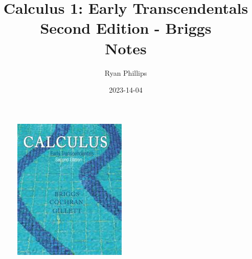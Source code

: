 \documentclass[UTF8]{article}
\begin{document}
\title{%
  Calculus 1: Early Transcendentals\\
  \large Second Edition - Briggs\\
    Notes}

		\date{2023-14-04}
\author{Ryan Phillips}
\maketitle
\begin{figure}[h!]
	\center
  \includegraphics[width=.8\textwidth]{content/calc.jpg}
\end{figure}
\end{document}
